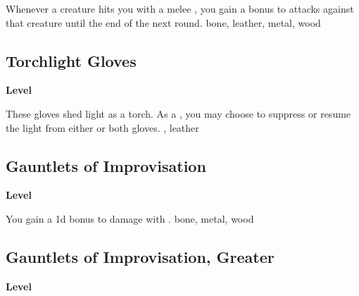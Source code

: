 Whenever a creature hits you with a melee , you gain a  bonus to  attacks against that creature until the end of the next round.
 
 bone, leather, metal, wood
\begin{multicols}{2}
\lowercase{\hypertarget{item:Torchlight Gloves}{}}\label{item:Torchlight Gloves}
\hypertarget{item:Torchlight Gloves}{\subsection{Torchlight Gloves}}
\columnbreak%
\begin{flushright}
\large\textbf{ Level}
\end{flushright}
\end{multicols}
\vspace{-1.5em}  %
These gloves shed light as a torch.
As a , you may choose to suppress or resume the light from either or both gloves.
 , 
 leather
\begin{multicols}{2}
\lowercase{\hypertarget{item:Gauntlets of Improvisation}{}}\label{item:Gauntlets of Improvisation}
\hypertarget{item:Gauntlets of Improvisation}{\subsection{Gauntlets of Improvisation}}
\columnbreak%
\begin{flushright}
\large\textbf{ Level}
\end{flushright}
\end{multicols}
\vspace{-1.5em}  %
You gain a \plus1d bonus to damage with .
 
 bone, metal, wood
\begin{multicols}{2}
\lowercase{\hypertarget{item:Gauntlets of Improvisation, Greater}{}}\label{item:Gauntlets of Improvisation, Greater}
\hypertarget{item:Gauntlets of Improvisation, Greater}{\subsection{Gauntlets of Improvisation, Greater}}
\columnbreak%
\begin{flushright}
\large\textbf{ Level}
\end{flushright}
\end{multicols}
